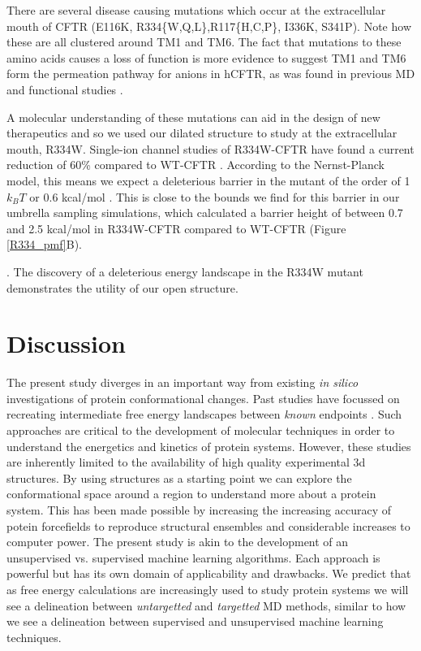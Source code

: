 There are several disease causing mutations which occur at the extracellular mouth of CFTR (E116K, R334\{W,Q,L\},R117\{H,C,P\}, I336K, S341P)\cite{cftr2}. Note how these are all clustered around TM1 and TM6. The fact that mutations to these amino acids causes a loss of function is more evidence to suggest TM1 and TM6 form the permeation pathway for anions in hCFTR, as was found in previous MD and functional studies \cite{zeng2021,farkas2020, linsdell2016, linsdell2018}. 

A molecular understanding of these mutations can aid in the design of new therapeutics and so we used our dilated structure to study at the extracellular mouth, R334W. Single-ion channel studies of R334W-CFTR have found a current reduction of 60\% compared to WT-CFTR \cite{gong2004}. According to the Nernst-Planck model, this means we expect a deleterious barrier in the mutant of the order of 1 $k_B T$ or 0.6 kcal/mol  \cite{kuyucak2001}. This is close to the bounds we find for this barrier in our umbrella sampling simulations, which calculated a barrier height of between 0.7 and 2.5 kcal/mol in R334W-CFTR compared to WT-CFTR (Figure \ref{R334_pmf}B). 

. The discovery of a deleterious energy landscape in the R334W mutant demonstrates the utility of our open structure.  


\section{Discussion}

The present study diverges in an important way from existing \textit{in silico} investigations of protein conformational changes. Past studies have focussed on recreating intermediate free energy landscapes between \textit{known} endpoints \cite{lev2020, bergh2021, moradi2015}. Such approaches are critical to the development of molecular techniques in order to understand the energetics and kinetics of protein systems. However, these studies are inherently limited to the availability of high quality experimental 3d structures. By using structures as a starting point we can explore the conformational space around a region to understand more about a protein system. This has been made possible by increasing the increasing accuracy of potein forcefields to reproduce structural ensembles \cite{huang2016} and considerable increases to computer power. The present study is akin to the development of an unsupervised vs. supervised machine learning algorithms. Each approach is powerful but has its own domain of applicability and drawbacks. 
We predict that as free energy calculations are increasingly used to study protein systems we will see a delineation between \textit{untargetted} and \textit{targetted} MD methods, similar to how we see a delineation between supervised and unsupervised machine learning techniques.


